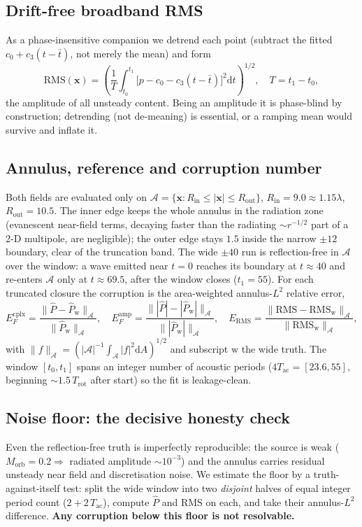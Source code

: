 \documentclass{jfm}
\newcommand{\dd}{\mathrm{d}}
\newcommand{\xv}{\bm{x}}
\newcommand{\Aann}{\mathcal{A}}
\begin{document}
\subsection{Drift-free broadband RMS}
As a phase-insensitive companion we detrend each point (subtract the fitted
$c_0+c_3(t-\bar t)$, not merely the mean) and form
\begin{equation}
\mathrm{RMS}(\xv)=\left(\frac1T\int_{t_0}^{t_1}
\big[p-c_0-c_3(t-\bar t)\big]^2\dd t\right)^{1/2},\quad T=t_1-t_0,
\end{equation}
the amplitude of all unsteady content. Being an amplitude it is phase-blind by
construction; detrending (not de-meaning) is essential, or a ramping mean would
survive and inflate it.

\subsection{Annulus, reference and corruption number}
Both fields are evaluated only on
$\Aann=\{\xv:R_{\mathrm{in}}\le|\xv|\le R_{\mathrm{out}}\}$,
$R_{\mathrm{in}}=9.0\approx1.15\lambda$, $R_{\mathrm{out}}=10.5$. The inner edge
keeps the whole annulus in the radiation zone (evanescent near-field terms,
decaying faster than the radiating $\sim r^{-1/2}$ part of a 2-D multipole, are
negligible); the outer edge stays $1.5$ inside the narrow $\pm12$ boundary,
clear of the truncation band. The wide $\pm40$ run is reflection-free in $\Aann$
over the window: a wave emitted near $t=0$ reaches its boundary at $t\approx40$
and re-enters $\Aann$ only at $t\approx69.5$, after the window closes
($t_1=55$). For each truncated closure the corruption is the area-weighted
annulus-$L^2$ relative error,
\begin{equation}
E_F^{\mathrm{cplx}}=\frac{\|\hat P-\hat P_{\mathrm w}\|_\Aann}{\|\hat P_{\mathrm w}\|_\Aann},\quad
E_F^{\mathrm{amp}}=\frac{\big\||\hat P|-|\hat P_{\mathrm w}|\big\|_\Aann}{\big\||\hat P_{\mathrm w}|\big\|_\Aann},\quad
E_{\mathrm{RMS}}=\frac{\|\mathrm{RMS}-\mathrm{RMS}_{\mathrm w}\|_\Aann}{\|\mathrm{RMS}_{\mathrm w}\|_\Aann},
\end{equation}
with $\|f\|_\Aann=(|\Aann|^{-1}\!\int_\Aann|f|^2\dd A)^{1/2}$ and subscript $\mathrm w$
the wide truth. The window $[t_0,t_1]$ spans an integer number of acoustic
periods ($4T_{\mathrm{ac}}=[23.6,55]$, beginning $\sim1.5\,T_{\mathrm{rot}}$
after start) so the fit is leakage-clean.

\subsection{Noise floor: the decisive honesty check}
Even the reflection-free truth is imperfectly reproducible: the source is weak
($M_{\mathrm{orb}}=0.2\Rightarrow$ radiated amplitude $\sim10^{-3}$) and the
annulus carries residual unsteady near field and discretisation noise. We
estimate the floor by a truth-against-itself test: split the wide window into
two \emph{disjoint} halves of equal integer period count ($2+2\,T_{\mathrm{ac}}$),
compute $\hat P$ and $\mathrm{RMS}$ on each, and take their annulus-$L^2$
difference. \textbf{Any corruption below this floor is not resolvable.}
\end{document}
